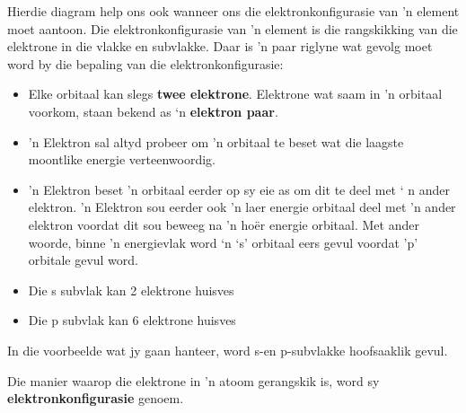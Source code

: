 \label{m38741*eip-752}Hierdie diagram help ons ook wanneer ons die elektronkonfigurasie van 'n element moet aantoon. Die elektronkonfigurasie van 'n element is die rangskikking van die elektrone in die vlakke en subvlakke. Daar is 'n paar riglyne wat gevolg moet word by die bepaling van die elektronkonfigurasie:
\par \label{m38741*id259303}\begin{itemize}[noitemsep]
            \label{m38741*uid93}\item Elke orbitaal kan slegs \textbf{twee elektrone}. Elektrone wat saam in 'n orbitaal voorkom, staan bekend as ‘n \textbf{elektron paar}.
\label{m38741*uid94}\item 'n Elektron sal altyd probeer om 'n orbitaal te beset wat die laagste moontlike energie verteenwoordig.
\label{m38741*uid95}\item 'n Elektron beset 'n orbitaal eerder op sy eie as om dit te deel met ‘ n ander elektron. 'n Elektron sou eerder ook 'n laer energie orbitaal deel met 'n ander elektron voordat dit sou beweeg na 'n hoër energie orbitaal. Met ander woorde, binne 'n energievlak word ‘n ‘s' orbitaal eers gevul voordat 'p' orbitale gevul word.
\label{m38741*uid83}\item Die s subvlak kan 2 elektrone huisves
\label{m38741*uid84}\item Die p subvlak kan 6 elektrone huisves
\end{itemize}
        \label{m38741*eip-15}In die voorbeelde wat jy gaan hanteer, word s-en p-subvlakke hoofsaaklik gevul.
\par 
        \label{m38741*id259599}Die manier waarop die elektrone in 'n atoom gerangskik is, word sy \textbf{elektronkonfigurasie} genoem.\par 

